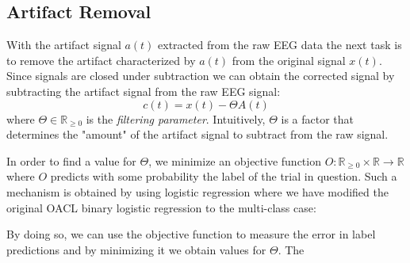 \subsection{Artifact Removal}
With the artifact signal $a(t)$ extracted from the raw EEG data the next task is to remove the artifact characterized by $a(t)$ from the original signal $x(t)$. Since signals are closed under subtraction we can obtain the corrected signal by subtracting the artifact signal from the raw EEG signal:
\begin{equation}
\label{eq:correctedsignal}
c(t) = x(t) - \Theta A(t)
\end{equation}
where $\Theta \in \mathbb{R}_{\geq 0}$ is the \emph{filtering parameter}. Intuitively, $\Theta$ is a factor that determines the "amount" of the artifact signal to subtract from the raw signal. 

In order to find a value for $\Theta$, we minimize an objective function $O : \mathbb{R}_{\geq 0} \times \mathbb{R} \rightarrow \mathbb{R}$ where $O$ predicts with some probability the label of the trial in question. Such a mechanism is obtained by using logistic regression where we have modified the original OACL binary logistic regression to the multi-class case:

By doing so, we can use the objective function to measure the error in label predictions and by minimizing it we obtain values for $\Theta$. The 